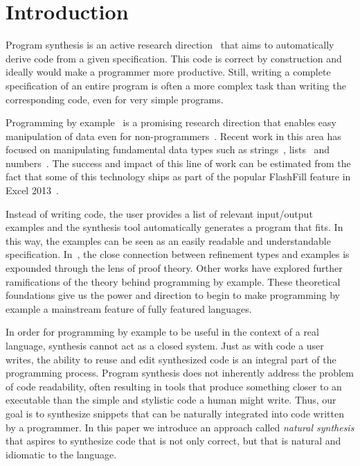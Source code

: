 \section{Introduction}
\label{intro}

Program synthesis is an active research direction~\cite{DBLP:journals/toplas/MannaW80, DBLP:journals/cacm/GulwaniHS12,DBLP:conf/icfp/Bodik15, DBLP:conf/pldi/KuncakMPS10, DBLP:conf/aplas/Solar-Lezama09, DBLP:conf/pldi/SrivastavaGCF11} that aims to automatically derive code from a given specification.
This code is correct by construction and ideally would make a programmer more productive.
Still, writing a complete specification of an entire program is often a more complex task than writing the corresponding code, even for very simple programs.


Programming by example~\cite{cypher93,lieberman01,synasc12} is a promising research direction that enables easy manipulation of data even for non-programmers~\cite{GulwaniHS12}.
Recent work in this area has focused on manipulating fundamental data types such as strings~\cite{flashFillPOPL,vldb12,icml13}, lists~\cite{FeserCD15,Osera:2015} and numbers~\cite{cav12}.
The success and impact of this line of work can be estimated from the fact that some of this technology ships as part of the popular FlashFill feature in Excel 2013~\cite{flashFillPOPL}.

Instead of writing code, the user provides a list of relevant input/output examples and the synthesis tool automatically generates a program that fits.
In this way, the examples can be seen as an easily readable and understandable specification.
In~\cite{Osera:2016}, the close connection between refinement types and examples is expounded through the lens of proof theory.
Other works have explored further ramifications of the theory behind programming by example\cite{Osera:2015, GulwaniHS12, synasc12}.
These theoretical foundations give us the power and direction to begin to make programming by example a mainstream feature of fully featured languages.

In order for programming by example to be useful in the context of a real language, synthesis cannot act as a closed system.
Just as with code a user writes, the ability to reuse and edit synthesized code is an integral part of the programming process.
Program synthesis does not inherently address the problem of code readability, often resulting in tools that produce something closer to an executable than the simple and stylistic code a human might write.
Thus, our goal is to synthesize snippets that can be naturally integrated into code written by a programmer.
In this paper we introduce an approach called \textit{natural synthesis} that aspires to synthesize code that is not only correct, but that is natural and idiomatic to the language.



